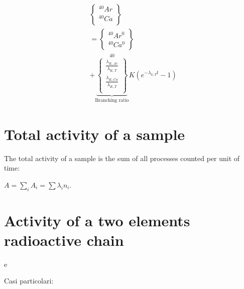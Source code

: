 \begin{align*}
&\left\{ \begin{array}{c} ^{40}Ar\\^{40}Ca\\ \end{array} \right\}\\
&= \left\{ \begin{array}{c} ^{40}Ar^0 \\ ^{40}Ca^0 \end{array} \right\}\\
&+ \underbrace{\left\{\begin{array}{c} \frac{\lambda_{K,Ar}}{\lambda_{K,T}}\\ \frac{\lambda_{K,Ca}}{\lambda_{K,T}}\\ \end{array}\right\}}_{\text{Branching ratio}}^{40}K(e^{-\lambda_{k,T}t}-1)
\end{align*}

\section{Total activity of a sample}

The total activity of a sample is the sum of all processes counted per unit of time:

$A=\sum_iA_i=\sum\lambda_in_i$.

\section{Activity of a two elements radioactive chain}

 e 

Casi particolari:

